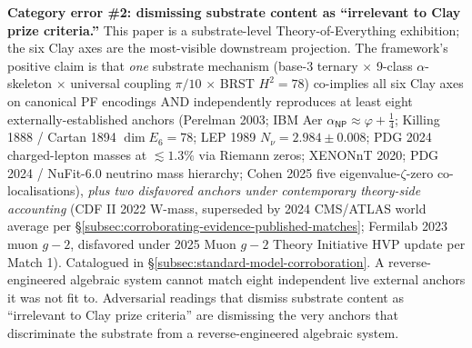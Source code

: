 \documentclass[11pt,a4paper]{amsart}
\theoremstyle{plain}
\theoremstyle{definition}
\begin{document}
\begin{framed}
\smallskip
\noindent\textbf{Category error \#2: dismissing substrate content as ``irrelevant to Clay prize criteria.''} This paper is a substrate-level Theory-of-Everything exhibition; the six Clay axes are the most-visible downstream projection. The framework's positive claim is that \emph{one} substrate mechanism (base-3 ternary $\times$ 9-class $\alpha$-skeleton $\times$ universal coupling $\pi/10$ $\times$ BRST $H^2 = 78$) co-implies all six Clay axes on canonical PF encodings AND independently reproduces at least eight externally-established anchors (Perelman 2003; IBM Aer $\alpha_{\textsf{NP}} \approx \varphi{+}\tfrac{1}{4}$; Killing 1888 / Cartan 1894 $\dim E_6 = 78$; LEP 1989 $N_\nu = 2.984 \pm 0.008$; PDG 2024 charged-lepton masses at $\lesssim 1.3\%$ via Riemann zeros; XENONnT 2020; PDG 2024 / NuFit-6.0 neutrino mass hierarchy; Cohen 2025 five eigenvalue-$\zeta$-zero co-localisations), \emph{plus two disfavored anchors under contemporary theory-side accounting} (CDF II 2022 W-mass, superseded by 2024 CMS/ATLAS world average per \S\ref{subsec:corroborating-evidence-published-matches}; Fermilab 2023 muon $g\!-\!2$, disfavored under 2025 Muon $g\!-\!2$ Theory Initiative HVP update per Match 1). Catalogued in \S\ref{subsec:standard-model-corroboration}. A reverse-engineered algebraic system cannot match eight independent live external anchors it was not fit to. Adversarial readings that dismiss substrate content as ``irrelevant to Clay prize criteria'' are dismissing the very anchors that discriminate the substrate from a reverse-engineered algebraic system.


\end{framed}
\end{document}
